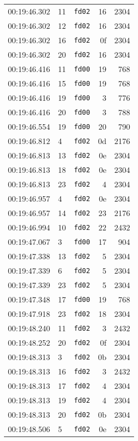 \documentclass{article}
\begin{document}
\begin{longtable}{lllrr}
00:19:46.302 & 11 & \texttt{fd02} & 16 & 2304 \\
00:19:46.302 & 12 & \texttt{fd02} & 16 & 2304 \\
00:19:46.302 & 16 & \texttt{fd02} & 0f & 2304 \\
00:19:46.302 & 20 & \texttt{fd02} & 16 & 2304 \\
00:19:46.416 & 11 & \texttt{fd00} & 19 & 768 \\
00:19:46.416 & 15 & \texttt{fd00} & 19 & 768 \\
00:19:46.416 & 19 & \texttt{fd00} & 3 & 776 \\
00:19:46.416 & 20 & \texttt{fd00} & 3 & 788 \\
00:19:46.554 & 19 & \texttt{fd00} & 20 & 790 \\
00:19:46.812 & 4 & \texttt{fd02} & 0d & 2176 \\
00:19:46.813 & 13 & \texttt{fd02} & 0e & 2304 \\
00:19:46.813 & 18 & \texttt{fd02} & 0e & 2304 \\
00:19:46.813 & 23 & \texttt{fd02} & 4 & 2304 \\
00:19:46.957 & 4 & \texttt{fd02} & 0e & 2304 \\
00:19:46.957 & 14 & \texttt{fd02} & 23 & 2176 \\
00:19:46.994 & 10 & \texttt{fd02} & 22 & 2432 \\
00:19:47.067 & 3 & \texttt{fd00} & 17 & 904 \\
00:19:47.338 & 13 & \texttt{fd02} & 5 & 2304 \\
00:19:47.339 & 6 & \texttt{fd02} & 5 & 2304 \\
00:19:47.339 & 23 & \texttt{fd02} & 5 & 2304 \\
00:19:47.348 & 17 & \texttt{fd00} & 19 & 768 \\
00:19:47.918 & 23 & \texttt{fd02} & 18 & 2304 \\
00:19:48.240 & 11 & \texttt{fd02} & 3 & 2432 \\
00:19:48.252 & 20 & \texttt{fd02} & 0f & 2304 \\
00:19:48.313 & 3 & \texttt{fd02} & 0b & 2304 \\
00:19:48.313 & 16 & \texttt{fd02} & 3 & 2432 \\
00:19:48.313 & 17 & \texttt{fd02} & 4 & 2304 \\
00:19:48.313 & 19 & \texttt{fd02} & 4 & 2304 \\
00:19:48.313 & 20 & \texttt{fd02} & 0b & 2304 \\
00:19:48.506 & 5 & \texttt{fd02} & 0e & 2304 \\

\end{longtable}
\end{document}
